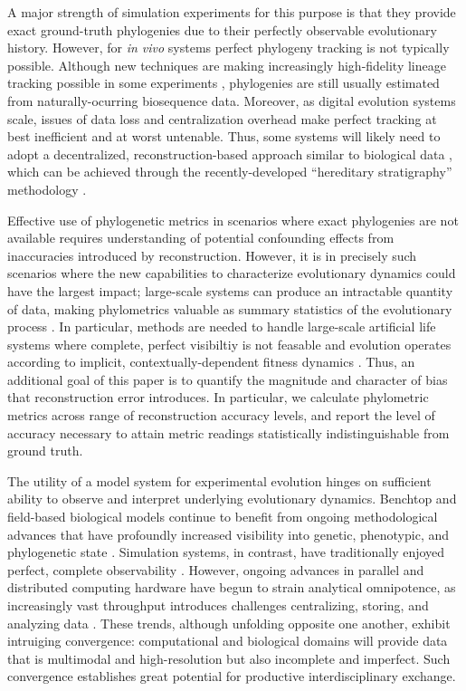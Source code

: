 A major strength of simulation experiments for this purpose is that they provide exact ground-truth phylogenies due to their perfectly observable evolutionary history.
However, for \textit{in vivo} systems perfect phylogeny tracking is not typically possible. Although new techniques are making increasingly high-fidelity lineage tracking possible in some experiments \citep{nozoe2017inferring,woodworth2017building}, phylogenies are still usually estimated from naturally-ocurring biosequence data.
Moreover, as digital evolution systems scale, issues of data loss and centralization overhead make perfect tracking at best inefficient and at worst untenable.
Thus, some systems will likely need to adopt a decentralized, reconstruction-based approach similar to biological data \citep{moreno2024analysis}, which can be achieved through the recently-developed ``hereditary stratigraphy'' methodology \citep{moreno2022hstrat}.

Effective use of phylogenetic metrics in scenarios where exact phylogenies are not available requires understanding of potential confounding effects from inaccuracies introduced by reconstruction.
However, it is in precisely such scenarios where the new capabilities to characterize evolutionary dynamics could have the largest impact; large-scale systems can produce an intractable quantity of data, making phylometrics valuable as summary statistics of the evolutionary process \citep{dolsonInferring2020}.
In particular, methods are needed to handle large-scale artificial life systems where complete, perfect visibiltiy is not feasable and evolution operates according to implicit, contextually-dependent fitness dynamics \citep{moreno2022exploring,kojima2023implementation}.
Thus, an additional goal of this paper is to quantify the magnitude and character of bias that reconstruction error introduces.
In particular, we calculate phylometric metrics across range of reconstruction accuracy levels, and report the level of accuracy necessary to attain metric readings statistically indistinguishable from ground truth.

The utility of a model system for experimental evolution hinges on sufficient ability to observe and interpret underlying evolutionary dynamics.
Benchtop and field-based biological models continue to benefit from ongoing methodological advances that have profoundly increased visibility into genetic, phenotypic, and phylogenetic state \citep{woodworth2017building,blomberg2011measuring,schneider2019past}.
Simulation systems, in contrast, have traditionally enjoyed perfect, complete observability \citep{hindre2012new}.
However, ongoing advances in parallel and distributed computing hardware have begun to strain analytical omnipotence, as increasingly vast throughput introduces challenges centralizing, storing, and analyzing data \citep{klasky2021data}.
These trends, although unfolding opposite one another, exhibit intruiging convergence: computational and biological domains will provide data that is multimodal and high-resolution but also incomplete and imperfect.
Such convergence establishes great potential for productive interdisciplinary exchange.

